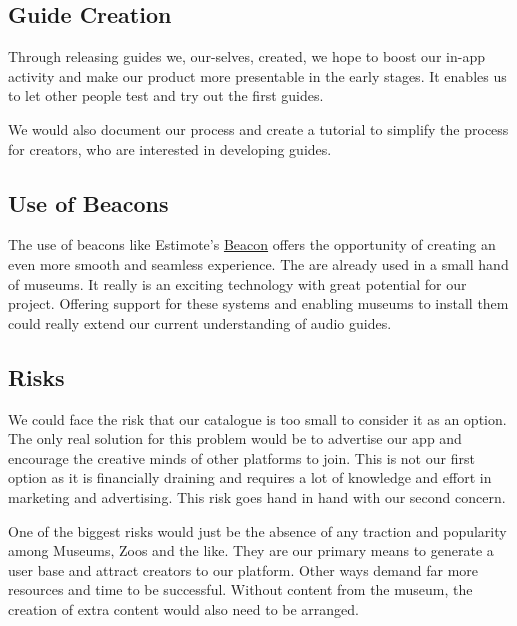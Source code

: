 \documentclass[12pt]{article}
\theoremstyle{definition}
\newenvironment{text}{
}{}
\begin{document}
\subsection{Guide Creation}
\begin{text}
Through releasing guides we, our-selves, created, we hope to boost our in-app activity and make our product more presentable in the early stages. It enables us to let other people test and try out the first guides.\newline

We would also document our process and create a tutorial to simplify the process for creators, who are interested in developing guides. \newline
\end{text}

\subsection{Use of Beacons}
\begin{text}
 The use of beacons like Estimote's \href{https://estimote.com/}{Beacon} offers the opportunity of creating an even more smooth and seamless experience. The are already used in a small hand of museums. It really is an exciting technology with great potential for our project. Offering support for these systems and enabling museums to install them could really extend our current understanding of audio guides. 
 
\end{text}

\subsection{Risks}
\begin{text}
We could face the risk that our catalogue is too small to consider it as an option. The only real solution for this problem would be to advertise our app and encourage the creative minds of other platforms to join.  This is not our first option as it is financially draining and requires a lot of knowledge and effort in marketing and advertising. This risk goes hand in hand with our second concern.

One of the biggest risks would just be the absence of any traction and popularity among Museums, Zoos and the like. They are our primary means to generate a user base and attract creators to our platform. Other ways demand far more resources and time to be successful. 
Without content from the museum, the creation of extra content would also need to be arranged.
\end{text}
\end{document}
